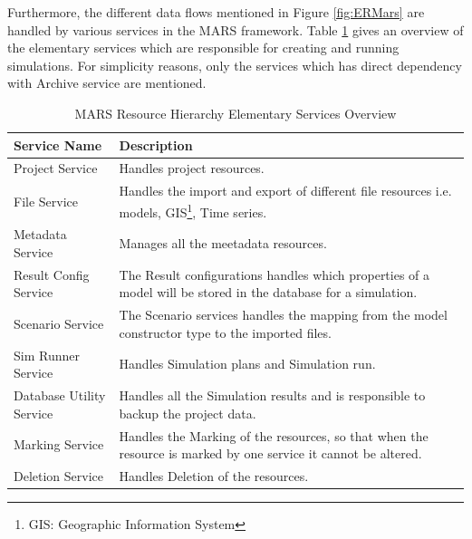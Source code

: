         \newpage
        Furthermore, the different data flows mentioned in Figure \ref{fig:ERMars} are handled by various services in the MARS framework. 
        Table \ref{table:MARS Resource Hierarchy Service Overview} gives an overview of the elementary services which are responsible for 
        creating and running simulations. For simplicity reasons, only the services
        which has direct dependency with Archive service are mentioned.
        \begin{table}[h!]
            \centering
            \begin{tabular}{|p{4cm}|p{10.5cm}|}
                \hline
                    \textbf{Service Name}  & \textbf{Description}\\
                \hline
                    Project Service & 
                    Handles project resources. \\
                \hline
                    File Service
                    & Handles the import and export of different file resources i.e. models, GIS\footnote{\label{footnote:GIS}GIS: Geographic Information System}, 
                    Time series.\\
                \hline
                    Metadata Service  & Manages all the meetadata resources.\\
                \hline
                    Result Config Service  & The Result configurations handles which properties of a model will be stored in the database for a simulation.\\
                \hline
                    Scenario Service  & The Scenario services handles the mapping from the model constructor type to the imported files.\\
                \hline
                    Sim Runner Service  & Handles Simulation plans and Simulation run.\\
                \hline
                    Database Utility Service  & Handles all the Simulation results and is responsible to backup the project data.\\
                \hline
                    Marking Service  & Handles the Marking of the resources, so that when the resource is marked by one service it cannot be altered.\\
                \hline
                    Deletion Service  & Handles Deletion of the resources.\\
                \hline
            \end{tabular}
            \caption{MARS Resource Hierarchy Elementary Services Overview}
            \label{table:MARS Resource Hierarchy Service Overview}     
        \end{table}    